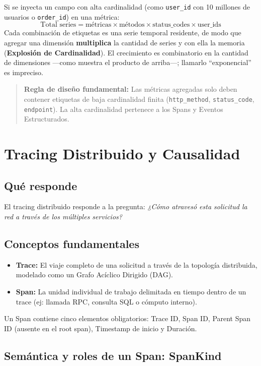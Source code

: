 \documentclass[variant=apuntes,cover=institutional,mode=screen]{ua-engineering-v6-article}
\begin{document}
Si se inyecta un campo con alta cardinalidad (como \texttt{user\_id} con 10 millones de usuarios o \texttt{order\_id}) en una métrica:
\[
\text{Total series} = \text{métricas} \times \text{métodos} \times \text{status\_codes} \times \text{user\_ids}
\]
Cada combinación de etiquetas es una serie temporal residente, de modo que agregar una dimensión \textbf{multiplica} la cantidad de series y con ella la memoria (\textbf{Explosión de Cardinalidad}). El crecimiento es combinatorio en la cantidad de dimensiones ---como muestra el producto de arriba---; llamarlo ``exponencial'' es impreciso.

\begin{quote}
\textbf{Regla de diseño fundamental:} Las métricas agregadas solo deben contener etiquetas de baja cardinalidad finita (\texttt{http\_method}, \texttt{status\_code}, \texttt{endpoint}). La alta cardinalidad pertenece a los Spans y Eventos Estructurados.
\end{quote}

\section{Tracing Distribuido y Causalidad}

\subsection{Qué responde}
El tracing distribuido responde a la pregunta: \emph{¿Cómo atravesó esta solicitud la red a través de los múltiples servicios?}

\subsection{Conceptos fundamentales}
\begin{itemize}
\item \textbf{Trace:} El viaje completo de una solicitud a través de la topología distribuida, modelado como un Grafo Acíclico Dirigido (DAG).
\item \textbf{Span:} La unidad individual de trabajo delimitada en tiempo dentro de un trace (ej: llamada RPC, consulta SQL o cómputo interno).
\end{itemize}

Un Span contiene cinco elementos obligatorios: Trace ID, Span ID, Parent Span ID (ausente en el root span), Timestamp de inicio y Duración.

\subsection{Semántica y roles de un Span: SpanKind}
\end{document}

